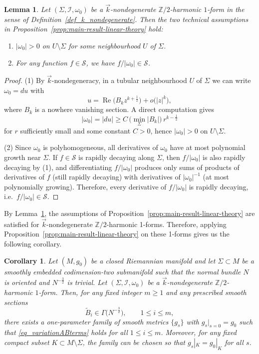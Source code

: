 \documentclass[11pt]{amsart}
\newcommand{\ZT}{\mathbb{Z}/2}
\renewcommand{\Re}{\operatorname{Re}}
\newcommand{\Msch}{\MS}
\newcommand{\MS}{\mathcal{S}}
\newtheorem{lemma}[theorem]{Lemma}
\newtheorem{corollary}[theorem]{Corollary}
\begin{document}
\begin{lemma}\label{lem:k-nondegenerate_satisfies_tech_assumptions}
	Let $(\Sigma,\mathcal I,\omega_0)$ be a $\vec{k}$-nondegenerate $\ZT$-harmonic $1$-form
	in the sense of Definition~\ref{def_k_nondegenerate}.
	Then the two technical assumptions in Proposition~\ref{prop:main-result-linear-theory} hold:
	\begin{enumerate}
		\item $|\omega_0|>0$ on $U\setminus \Sigma$ for some neighbourhood $U$ of $\Sigma$.
		\item For any function $f\in \Msch$, we have $f/|\omega_0|\in \Msch$.
	\end{enumerate}
\end{lemma}

\begin{proof}
	(1) By $\vec{k}$-nondegeneracy, in a tubular neighbourhood $U$ of $\Sigma$ we can write
	$\omega_0=du$ with
	\[
	u=\Re\!\big(B_k z^{k+\frac12}\big)+o\big(|z|^k\big),
	\]
	where $B_k$ is a nowhere vanishing section.
	A direct computation gives 
	$$ |\omega_0|=|du|\ge C\,\Big(\min_{\Sigma}|B_k|\Big)\,r^{k-\frac12}$$
	for $r$ sufficiently small and some constant $C>0$, hence $|\omega_0|>0$ on $U\setminus\Sigma$.
	
	\smallskip
	(2) Since $\omega_0$ is polyhomogeneous, all derivatives of $\omega_0$ have at most polynomial growth
	near $\Sigma$.
	If $f\in \Msch$ is rapidly decaying along $\Sigma$, then $f/|\omega_0|$ is also rapidly decaying by (1),
	and differentiating $f/|\omega_0|$ produces only sums of products of derivatives of $f$
	(still rapidly decaying) with derivatives of $|\omega_0|^{-1}$ (at most polynomially growing).
	Therefore, every derivative of $f/|\omega_0|$ is rapidly decaying, i.e.\ $f/|\omega_0|\in \Msch$.
\end{proof}

By Lemma~\ref{lem:k-nondegenerate_satisfies_tech_assumptions},
the assumptions of Proposition~\ref{prop:main-result-linear-theory} are satisfied for $\vec{k}$-nondegenerate $\ZT$-harmonic 1-forms. Therefore, applying Proposition~\ref{prop:main-result-linear-theory} on these 1-forms gives us the following corollary.

\begin{corollary}\label{cor:k-nondegenerate_apply_linear_theory}
	Let $(M,g_0)$ be a closed Riemannian manifold and let $\Sigma\subset M$ be a smoothly embedded
	codimension-two submanifold such that the normal bundle $N$ is oriented and $N^{-\frac32}$ is trivial.
	Let $(\Sigma,\mathcal I,\omega_0)$ be a $\vec{k}$-nondegenerate $\ZT$-harmonic $1$-form.
	Then, for any fixed integer $m\ge 1$ and any prescribed smooth sections
	\[
	\widetilde{B}_i \in \Gamma\!\big(N^{-\frac32}\big), \qquad 1\le i\le m,
	\]
	there exists a one-parameter family of smooth metrics $\{g_s\}$ with $g_{s}|_{s=0}=g_0$
	such that \eqref{eq_variationABterms} holds for all $1\le i\le m$.
	Moreover, for any fixed compact subset $K\subset M\setminus \Sigma$,
	the family can be chosen so that $g_s|_K=g_0|_K$ for all $s$.
\end{corollary}
\end{document}
